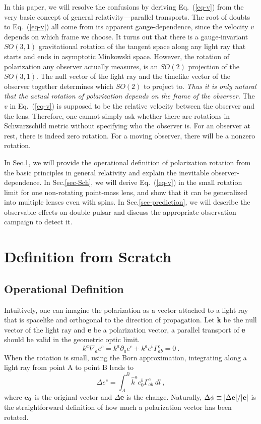 \documentclass[aps,showpacs,onecolumn,floats,prd,superscriptaddress,nofootinbib]{revtex4}
\begin{document}
In this paper, we will resolve the confusions by deriving Eq.~(\ref{eq-v}) from the very basic concept of general relativity---parallel transports. 
The root of doubts to Eq.~(\ref{eq-v}) all come from its apparent gauge-dependence, since the velocity $v$ depends on which frame we choose. 
It turns out that there is a gauge-invariant $SO(3,1)$ gravitational rotation of the tangent space along any light ray that starts and ends in asymptotic Minkowski space. 
However, the rotation of polarization any observer actually measures, is an $SO(2)$ projection of the $SO(3,1)$. 
The null vector of the light ray and the timelike vector of the observer together determines which $SO(2)$ to project to.
 {\it Thus it is only natural that the actual rotation of polarization depends on the frame of the observer. }
The $v$ in Eq.~(\ref{eq-v}) is supposed to be the relative velocity between the observer and the lens.
Therefore, one cannot simply ask whether there are rotations in Schwarzschild metric without specifying who the observer is.
For an observer at rest, there is indeed zero rotation.
For a moving observer, there will be a nonzero rotation.

In Sec.\ref{sec-born}, we will provide the operational definition of polarization rotation from the basic principles in general relativity and explain the inevitable observer-dependence.
In Sec.\ref{sec-Sch}, we will derive Eq.~(\ref{eq-v}) in the small rotation limit for one non-rotating point-mass lens, and show that it can be generalized into multiple lenses even with spins.
In Sec.\ref{sec-prediction}, we will describe the observable effects on double pulsar and discuss the appropriate observation campaign to detect it.

\section{Definition from Scratch}
\label{sec-born}

\subsection{Operational Definition}

Intuitively, one can imagine the polarization as a vector attached to a light ray that is spacelike and orthogonal to the direction of propagation. 
Let {\bf k} be the null vector of the light ray and {\bf e} be a polarization vector, a parallel transport of {\bf e} should be valid in the geometric optic limit.
\begin{equation}
k^a \nabla_a e^c = k^a \partial_a e^c + k^a e^b \Gamma_{ab}^c =0~.
\label{eq-para}
\end{equation}
When the rotation is small, using the Born approximation, integrating along a light ray from point A to point B leads to
\begin{equation}
\Delta e^c = \int_A^B \hat{k}^a e_0^b \Gamma_{ab}^c~dl~,
\label{eq-int}
\end{equation}
where ${\bf e_0}$ is the original vector and $\Delta${\bf e} is the change. 
Naturally, $\Delta \phi \equiv |\Delta {\bf e}|/|{\bf e}|$ is the straightforward definition of how much a polarization vector has been rotated.
\end{document}
